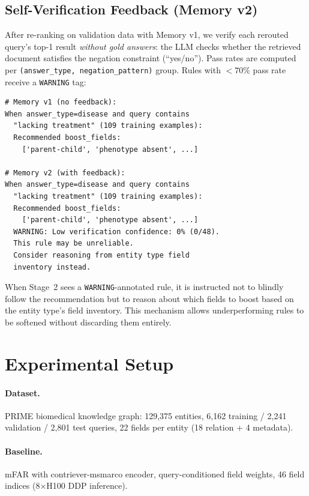 \documentclass[11pt]{article}
\begin{document}
\subsection{Self-Verification Feedback (Memory v2)}

After re-ranking on validation data with Memory v1, we verify each rerouted query's top-1 result \emph{without gold answers}: the LLM checks whether the retrieved document satisfies the negation constraint (``yes/no''). Pass rates are computed per \texttt{(answer\_type, negation\_pattern)} group. Rules with $<70\%$ pass rate receive a \texttt{WARNING} tag:

\begin{lstlisting}
# Memory v1 (no feedback):
When answer_type=disease and query contains
  "lacking treatment" (109 training examples):
  Recommended boost_fields:
    ['parent-child', 'phenotype absent', ...]

# Memory v2 (with feedback):
When answer_type=disease and query contains
  "lacking treatment" (109 training examples):
  Recommended boost_fields:
    ['parent-child', 'phenotype absent', ...]
  WARNING: Low verification confidence: 0% (0/48).
  This rule may be unreliable.
  Consider reasoning from entity type field
  inventory instead.
\end{lstlisting}

When Stage~2 sees a \texttt{WARNING}-annotated rule, it is instructed not to blindly follow the recommendation but to reason about which fields to boost based on the entity type's field inventory. This mechanism allows underperforming rules to be softened without discarding them entirely.

\section{Experimental Setup}

\paragraph{Dataset.} PRIME biomedical knowledge graph: 129,375 entities, 6,162 training / 2,241 validation / 2,801 test queries, 22 fields per entity (18 relation + 4 metadata).

\paragraph{Baseline.} mFAR with contriever-msmarco encoder, query-conditioned field weights, 46 field indices (8$\times$H100 DDP inference).
\end{document}
